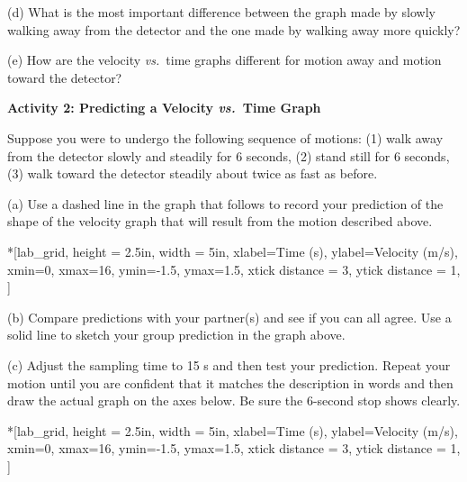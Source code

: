 (d) What is the most important difference between the graph made by slowly walking
away from the detector and the one made by walking away more quickly? 
\answerspace{25mm}

(e) How are the velocity \textit{vs.}~time graphs different for motion away and motion
toward the detector?
\answerspace{25mm}

\pagebreak[2]
\textbf{Activity 2: Predicting a Velocity \textit{vs.}~Time Graph }

Suppose you were to undergo the following sequence of motions: (1) walk away
from the detector slowly and steadily for 6 seconds, (2) stand still for 6 seconds,
(3) walk toward the detector steadily about twice as fast as before.

(a) Use a dashed line in the graph that follows to record your prediction of
the shape of the velocity graph that will result from the motion described above.

\begin{lab_axis}*[lab_grid,
	height = {2.5in}, width = {5in},
	xlabel={Time (s)},
	ylabel={Velocity (m/s)},
	xmin=0, xmax=16,
	ymin=-1.5, ymax=1.5,
	xtick distance = 3,
	ytick distance = 1,
	]
\end{lab_axis}

(b) Compare predictions with your partner(s) and see if you can all agree. Use
a solid line to sketch your group prediction in the graph above.

(c) Adjust the sampling time to 15 s and then test your prediction. Repeat your
motion until you are confident that it matches the description in words and
then draw the actual graph on the axes below. Be sure the 6-second stop shows
clearly.

\begin{lab_axis}*[lab_grid,
	height = {2.5in}, width = {5in},
	xlabel={Time (s)},
	ylabel={Velocity (m/s)},
	xmin=0, xmax=16,
	ymin=-1.5, ymax=1.5,
	xtick distance = 3,
	ytick distance = 1,
	]
\end{lab_axis}

